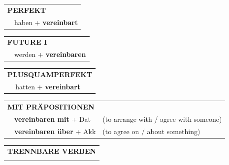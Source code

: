 \documentclass[10pt,a4paper]{revtex4-2}
\begin{document}
\begin{verbbox}
\vspace{10pt}

\begin{tabular}{rl}
\multicolumn{2}{l}{\textbf{PERFEKT}}\\
& haben + \textbf{vereinbart}\\
\end{tabular}
\hfill
\begin{tabular}{rl}
\multicolumn{2}{l}{\textbf{FUTURE I}}\\
& werden + \textbf{vereinbaren}\\
\end{tabular}
\hfill
\begin{tabular}{rl}
\multicolumn{2}{l}{\textbf{PLUSQUAMPERFEKT}}\\
& hatten + \textbf{vereinbart}\\
\end{tabular}

\vspace{10pt}

\begin{tabular}{lll}
\multicolumn{3}{l}{\textbf{MIT PRÄPOSITIONEN}}\\
& \textbf{vereinbaren mit} + Dat & (to arrange with / agree with someone)\\
& \textbf{vereinbaren über} + Akk & (to agree on / about something)\\
\end{tabular}
\hfill
\begin{tabular}{lll}
\multicolumn{3}{l}{\textbf{TRENNBARE VERBEN}}\\
\vspace{20pt}\end{tabular}
\vspace{-5pt}
\end{verbbox}
\end{document}
